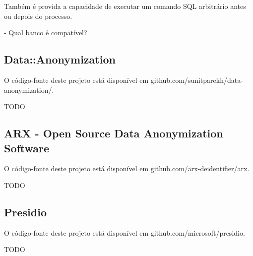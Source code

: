 Também é provida a capacidade de executar um comando SQL arbitrário antes ou depois do processo.

- Qual banco é compatível?

\subsection{Data::Anonymization}

O código-fonte deste projeto está disponível em github.com/sunitparekh/data-anonymization/.

TODO

\subsection{ARX - Open Source Data Anonymization Software}

O código-fonte deste projeto está disponível em github.com/arx-deidentifier/arx.

TODO

\subsection{Presidio}

O código-fonte deste projeto está disponível em github.com/microsoft/presidio.

TODO